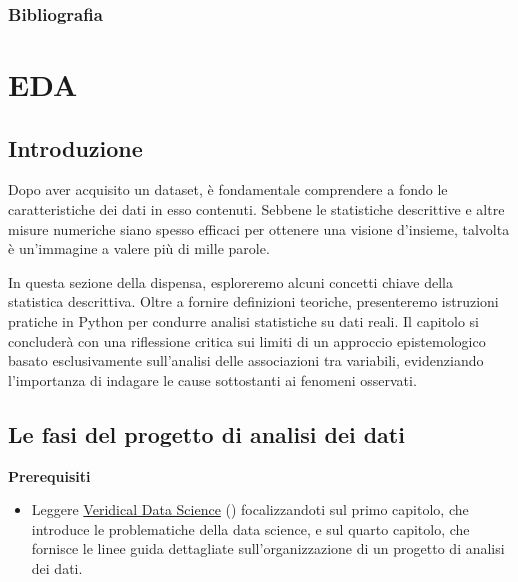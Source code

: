 \documentclass[
  letterpaper,
  DIV=11,
  numbers=noendperiod]{scrreprt}
\providecommand{\tightlist}{%
  \setlength{\itemsep}{0pt}\setlength{\parskip}{0pt}}\usepackage{longtable,booktabs,array}
\theoremstyle{definition}
\theoremstyle{remark}
\begin{document}
\section*{Bibliografia}\label{bibliografia-3}


\part{EDA}

\chapter*{Introduzione}\label{introduzione-5}


Dopo aver acquisito un dataset, è fondamentale comprendere a fondo le
caratteristiche dei dati in esso contenuti. Sebbene le statistiche
descrittive e altre misure numeriche siano spesso efficaci per ottenere
una visione d'insieme, talvolta è un'immagine a valere più di mille
parole.

In questa sezione della dispensa, esploreremo alcuni concetti chiave
della statistica descrittiva. Oltre a fornire definizioni teoriche,
presenteremo istruzioni pratiche in Python per condurre analisi
statistiche su dati reali. Il capitolo si concluderà con una riflessione
critica sui limiti di un approccio epistemologico basato esclusivamente
sull'analisi delle associazioni tra variabili, evidenziando l'importanza
di indagare le cause sottostanti ai fenomeni osservati.

\chapter{Le fasi del progetto di analisi dei
dati}\label{sec-proj-structure}

\textbf{Prerequisiti}

\begin{itemize}
\tightlist
\item
  Leggere \href{https://vdsbook.com}{Veridical Data Science}
  () focalizzandoti
  sul primo capitolo, che introduce le problematiche della data science,
  e sul quarto capitolo, che fornisce le linee guida dettagliate
  sull'organizzazione di un progetto di analisi dei dati.
\end{itemize}
\end{document}
